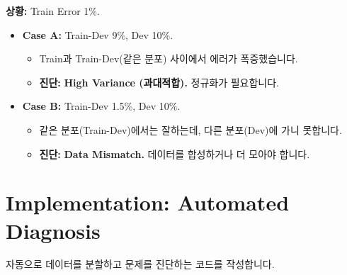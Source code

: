 \documentclass[11pt,a4paper]{book}
\theoremstyle{definition}
\begin{document}
\begin{analogybox}[title={시나리오 분석}]
\textbf{상황:} Train Error 1\%.
\begin{itemize}
    \item \textbf{Case A:} Train-Dev 9\%, Dev 10\%.
    \begin{itemize}
        \item Train과 Train-Dev(같은 분포) 사이에서 에러가 폭증했습니다.
        \item \textbf{진단:} \textbf{High Variance (과대적합).} 정규화가 필요합니다.
    \end{itemize}
    \item \textbf{Case B:} Train-Dev 1.5\%, Dev 10\%.
    \begin{itemize}
        \item 같은 분포(Train-Dev)에서는 잘하는데, 다른 분포(Dev)에 가니 못합니다.
        \item \textbf{진단:} \textbf{Data Mismatch.} 데이터를 합성하거나 더 모아야 합니다.
    \end{itemize}
\end{itemize}
\end{analogybox}

\section{Implementation: Automated Diagnosis}

자동으로 데이터를 분할하고 문제를 진단하는 코드를 작성합니다.
\end{document}
